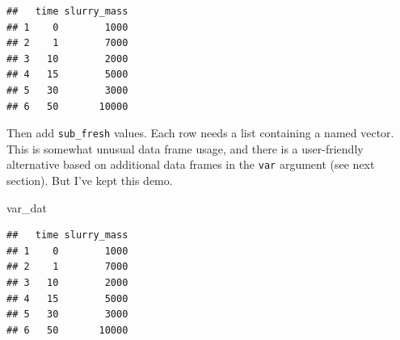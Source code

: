 \documentclass[
]{article}
\newenvironment{Shaded}{\begin{snugshade}}{\end{snugshade}}
\newcommand{\AttributeTok}[1]{\textcolor[rgb]{0.13,0.29,0.53}{#1}}
\newcommand{\DecValTok}[1]{\textcolor[rgb]{0.00,0.00,0.81}{#1}}
\newcommand{\FunctionTok}[1]{\textcolor[rgb]{0.13,0.29,0.53}{\textbf{#1}}}
\newcommand{\NormalTok}[1]{#1}
\newcommand{\OtherTok}[1]{\textcolor[rgb]{0.56,0.35,0.01}{#1}}
\newcommand{\SpecialCharTok}[1]{\textcolor[rgb]{0.81,0.36,0.00}{\textbf{#1}}}
\begin{document}
\begin{verbatim}
##   time slurry_mass
## 1    0        1000
## 2    1        7000
## 3   10        2000
## 4   15        5000
## 5   30        3000
## 6   50       10000
\end{verbatim}

Then add \texttt{sub\_fresh} values. Each row needs a list containing a
named vector. This is somewhat unusual data frame usage, and there is a
user-friendly alternative based on additional data frames in the
\texttt{var} argument (see next section). But I've kept this demo.

\begin{Shaded}
\begin{Highlighting}[]
\NormalTok{var\_dat}
\end{Highlighting}
\end{Shaded}

\begin{verbatim}
##   time slurry_mass
## 1    0        1000
## 2    1        7000
## 3   10        2000
## 4   15        5000
## 5   30        3000
## 6   50       10000
\end{verbatim}

\begin{Shaded}
\end{Shaded}
\end{document}
